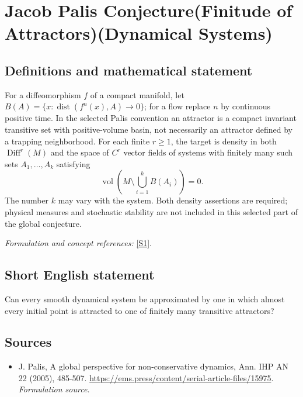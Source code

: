 \documentclass[11pt]{article}
\begin{document}
\section*{\texorpdfstring{Jacob Palis Conjecture(Finitude of Attractors)(Dynamical Systems)}{Jacob Palis Conjecture(Finitude of Attractors)(Dynamical Systems)}}\label{3433}
\subsection{Definitions and mathematical statement}
For a diffeomorphism $f$ of a compact manifold, let
$B(A)=\{x:\operatorname{dist}(f^n(x),A)\to0\}$; for a flow replace $n$ by continuous positive time. In the selected Palis convention an attractor is a compact invariant transitive set with positive-volume basin, not necessarily an attractor defined by a trapping neighborhood. For each finite $r\ge1$, the target is density in both $\operatorname{Diff}^r(M)$ and the space of $C^r$ vector fields of systems with finitely many such sets $A_1,\ldots,A_k$ satisfying
\[
 \operatorname{vol}\left(M\setminus\bigcup_{i=1}^k B(A_i)\right)=0.
\]
The number $k$ may vary with the system. Both density assertions are required; physical measures and stochastic stability are not included in this selected part of the global conjecture.
\par\smallskip\textit{Formulation and concept references:} \href{https://ems.press/content/serial-article-files/15975}{[S1]}.

\subsection{Short English statement}
Can every smooth dynamical system be approximated by one in which almost every initial point is attracted to one of finitely many transitive attractors?
\subsection{Sources}
\begin{itemize}
\item[S1]J. Palis, A global perspective for non-conservative dynamics, Ann. IHP AN 22 (2005), 485-507.
\url{https://ems.press/content/serial-article-files/15975}.
\textit{Formulation source.}
\end{itemize}
\end{document}
